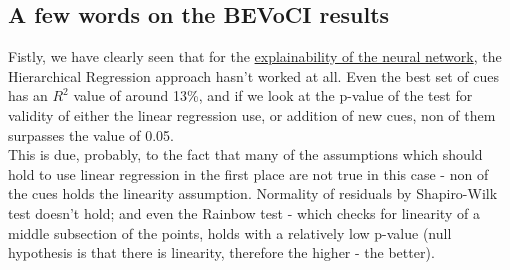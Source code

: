 \documentclass[11pt, oneside]{article}   	%
\begin{document}
\subsection{A few words on the BEVoCI results}
Fistly, we have clearly seen that for the \hyperref[sec:ffn_hlr]{explainability of the neural network}, the Hierarchical Regression approach hasn't worked at all. Even the best set of cues has an $R^2$ value of around 13\%, and if we look at the p-value of the test for validity of either the linear regression use, or addition of new cues, non of them surpasses the value of 0.05.\\
This is due, probably, to the fact that many of the assumptions which should hold to use linear regression in the first place are not true in this case - non of the cues holds the linearity assumption. Normality of residuals by Shapiro-Wilk test doesn't hold; and even the Rainbow test - which checks for linearity of a middle subsection of the points, holds with a relatively low p-value (null hypothesis is that there is linearity, therefore the higher - the better).
\end{document}
